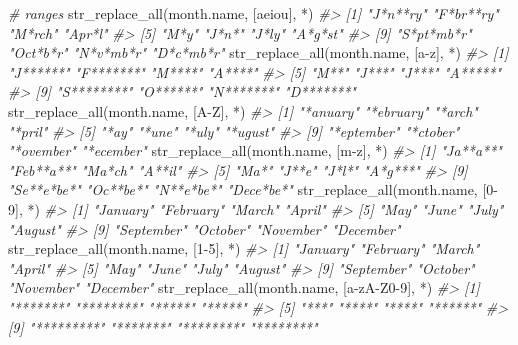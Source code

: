 \documentclass[
]{book}
\newenvironment{Shaded}{\begin{snugshade}}{\end{snugshade}}
\newcommand{\CommentTok}[1]{\textcolor[rgb]{0.56,0.35,0.01}{\textit{#1}}}
\newcommand{\FunctionTok}[1]{\textcolor[rgb]{0.00,0.00,0.00}{#1}}
\newcommand{\NormalTok}[1]{#1}
\newcommand{\StringTok}[1]{\textcolor[rgb]{0.31,0.60,0.02}{#1}}
\begin{document}
\begin{Shaded}
\begin{Highlighting}[]

\CommentTok{\# ranges}
\FunctionTok{str\_replace\_all}\NormalTok{(month.name, }\StringTok{\textquotesingle{}[aeiou]\textquotesingle{}}\NormalTok{, }\StringTok{\textquotesingle{}*\textquotesingle{}}\NormalTok{)}
\CommentTok{\#\textgreater{}  [1] "J*n**ry"   "F*br**ry"  "M*rch"     "Apr*l"    }
\CommentTok{\#\textgreater{}  [5] "M*y"       "J*n*"      "J*ly"      "A*g*st"   }
\CommentTok{\#\textgreater{}  [9] "S*pt*mb*r" "Oct*b*r"   "N*v*mb*r"  "D*c*mb*r"}
\FunctionTok{str\_replace\_all}\NormalTok{(month.name, }\StringTok{\textquotesingle{}[a{-}z]\textquotesingle{}}\NormalTok{, }\StringTok{\textquotesingle{}*\textquotesingle{}}\NormalTok{)}
\CommentTok{\#\textgreater{}  [1] "J******"   "F*******"  "M****"     "A****"    }
\CommentTok{\#\textgreater{}  [5] "M**"       "J***"      "J***"      "A*****"   }
\CommentTok{\#\textgreater{}  [9] "S********" "O******"   "N*******"  "D*******"}
\FunctionTok{str\_replace\_all}\NormalTok{(month.name, }\StringTok{\textquotesingle{}[A{-}Z]\textquotesingle{}}\NormalTok{, }\StringTok{\textquotesingle{}*\textquotesingle{}}\NormalTok{)}
\CommentTok{\#\textgreater{}  [1] "*anuary"   "*ebruary"  "*arch"     "*pril"    }
\CommentTok{\#\textgreater{}  [5] "*ay"       "*une"      "*uly"      "*ugust"   }
\CommentTok{\#\textgreater{}  [9] "*eptember" "*ctober"   "*ovember"  "*ecember"}
\FunctionTok{str\_replace\_all}\NormalTok{(month.name, }\StringTok{\textquotesingle{}[m{-}z]\textquotesingle{}}\NormalTok{, }\StringTok{\textquotesingle{}*\textquotesingle{}}\NormalTok{)}
\CommentTok{\#\textgreater{}  [1] "Ja**a**"   "Feb**a**"  "Ma*ch"     "A**il"    }
\CommentTok{\#\textgreater{}  [5] "Ma*"       "J**e"      "J*l*"      "A*g***"   }
\CommentTok{\#\textgreater{}  [9] "Se**e*be*" "Oc**be*"   "N**e*be*"  "Dece*be*"}
\FunctionTok{str\_replace\_all}\NormalTok{(month.name, }\StringTok{\textquotesingle{}[0{-}9]\textquotesingle{}}\NormalTok{, }\StringTok{\textquotesingle{}*\textquotesingle{}}\NormalTok{)}
\CommentTok{\#\textgreater{}  [1] "January"   "February"  "March"     "April"    }
\CommentTok{\#\textgreater{}  [5] "May"       "June"      "July"      "August"   }
\CommentTok{\#\textgreater{}  [9] "September" "October"   "November"  "December"}
\FunctionTok{str\_replace\_all}\NormalTok{(month.name, }\StringTok{\textquotesingle{}[1{-}5]\textquotesingle{}}\NormalTok{, }\StringTok{\textquotesingle{}*\textquotesingle{}}\NormalTok{)}
\CommentTok{\#\textgreater{}  [1] "January"   "February"  "March"     "April"    }
\CommentTok{\#\textgreater{}  [5] "May"       "June"      "July"      "August"   }
\CommentTok{\#\textgreater{}  [9] "September" "October"   "November"  "December"}
\FunctionTok{str\_replace\_all}\NormalTok{(month.name, }\StringTok{\textquotesingle{}[a{-}zA{-}Z0{-}9]\textquotesingle{}}\NormalTok{, }\StringTok{\textquotesingle{}*\textquotesingle{}}\NormalTok{)}
\CommentTok{\#\textgreater{}  [1] "*******"   "********"  "*****"     "*****"    }
\CommentTok{\#\textgreater{}  [5] "***"       "****"      "****"      "******"   }
\CommentTok{\#\textgreater{}  [9] "*********" "*******"   "********"  "********"}


\end{Highlighting}
\end{Shaded}
\end{document}

